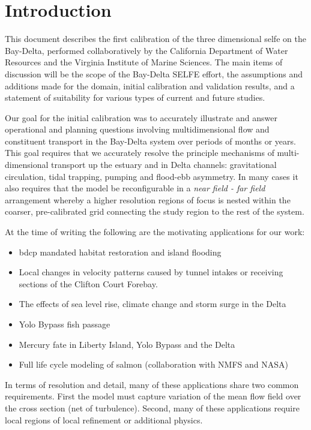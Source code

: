 \chapter{Introduction}
This document describes the first calibration of the three dimensional \gls{selfe}
on the Bay-Delta, performed collaboratively by the California Department of Water Resources 
and the Virginia Institute of Marine Sciences. The main items of discussion will be the scope of the Bay-Delta SELFE effort, 
the assumptions and additions made for the domain, initial calibration and validation results, 
and a statement of suitability for various types of current and future studies. 

Our goal for the initial calibration was to accurately illustrate and answer operational and planning 
questions involving multidimensional flow and constituent transport in the Bay-Delta system
over periods of months or years. This goal requires that we accurately resolve the principle mechanisms of multi-dimensional transport up the estuary and in Delta channels: 
gravitational circulation, tidal trapping, pumping and flood-ebb asymmetry. In many cases it also requires that the model
be reconfigurable in a {\em near field - far field} arrangement whereby a higher resolution regions of focus is nested 
within the coarser, pre-calibrated grid connecting the study region to the rest of the system.

At the time of writing the following are the motivating applications for our work:

\begin{itemize}
	\item \gls{bdcp} mandated habitat restoration and island flooding
  \item Local changes in velocity patterns caused by tunnel intakes or receiving sections of the Clifton Court Forebay.
	\item The effects of sea level rise, climate change and storm surge in the Delta
  \item Yolo Bypass fish passage
  \item Mercury fate in Liberty Island, Yolo Bypass and the Delta
  \item Full life cycle modeling of salmon (collaboration with NMFS and NASA)
\end{itemize}

In terms of resolution and detail, many of these applications share two common requirements. First the model 
must capture variation of the mean flow field over the cross section (net of turbulence). 
Second, many of these applications require local regions of local refinement or additional physics. 


